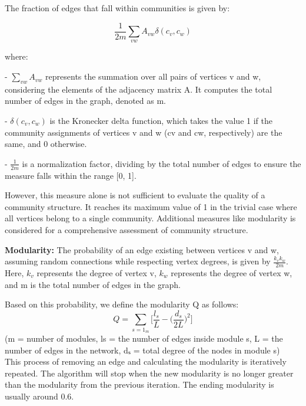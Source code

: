 The fraction of edges that fall within communities is given by:

\[
\frac{1}{2m} \sum_{vw} A_{vw} \delta(c_v, c_w)
\]

where:

- \(\sum_{vw} A_{vw}\) represents the summation over all pairs of vertices v and w, considering the elements of the adjacency matrix A. It computes the total number of edges in the graph, denoted as m.

- \(\delta(c_v, c_w)\) is the Kronecker delta function, which takes the value 1 if the community assignments of vertices v and w (cv and cw, respectively) are the same, and 0 otherwise.

- \(\frac{1}{2m}\) is a normalization factor, dividing by the total number of edges to ensure the measure falls within the range [0, 1].

However, this measure alone is not sufficient to evaluate the quality of a community structure. It reaches its maximum value of 1 in the trivial case where all vertices belong to a single community. Additional measures like modularity is considered for a comprehensive assessment of community structure.

\textbf{Modularity: } The probability of an edge existing between vertices v and w, assuming random connections while respecting vertex degrees, is given by \( \frac{k_v k_w}{2m} \). Here, \( k_v \) represents the degree of vertex v, \( k_w \) represents the degree of vertex w, and m is the total number of edges in the graph.

Based on this probability, we define the modularity Q as follows:
\begin{equation}
    Q = \sum_{s=1}_m\Big[\frac{l_s}{L}-\Big(\frac{d_s}{2L}\Big)^2\Big]
\end{equation}
(m = number of modules, ls = the number of edges inside module s, L = the number of edges in the network, dₛ = total degree of the nodes in module s)\\

This process of removing an edge and calculating the modularity is iteratively repeated. The algorithm will stop when the new modularity is no longer greater than the modularity from the previous iteration. The ending modularity is usually around 0.6.

